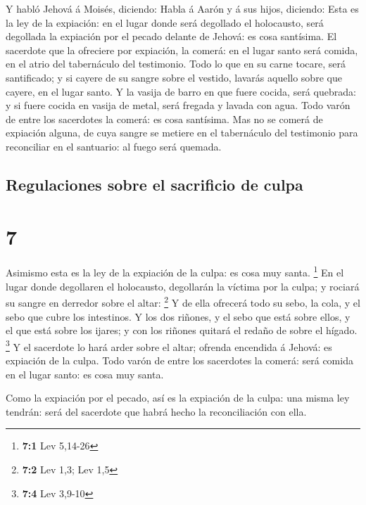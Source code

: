  Y habló Jehová á Moisés, diciendo:  Habla
á Aarón y á sus hijos, diciendo: Esta es la ley de la expiación: en el
lugar donde será degollado el holocausto, será degollada la expiación
por el pecado delante de Jehová: es cosa santísima.  El
sacerdote que la ofreciere por expiación, la comerá: en el lugar santo
será comida, en el atrio del tabernáculo del testimonio. 
Todo lo que en su carne tocare, será santificado; y si cayere de su
sangre sobre el vestido, lavarás aquello sobre que cayere, en el lugar
santo.  Y la vasija de barro en que fuere cocida, será
quebrada: y si fuere cocida en vasija de metal, será fregada y lavada
con agua.  Todo varón de entre los sacerdotes la comerá:
es cosa santísima.  Mas no se comerá de expiación alguna,
de cuya sangre se metiere en el tabernáculo del testimonio para
reconciliar en el santuario: al fuego será quemada.

\hypertarget{regulaciones-sobre-el-sacrificio-de-culpa}{%
\subsection{Regulaciones sobre el sacrificio de
culpa}\label{regulaciones-sobre-el-sacrificio-de-culpa}}

\hypertarget{section-6}{%
\section{7}\label{section-6}}

 Asimismo esta es la ley de la expiación de la culpa: es
cosa muy santa. \footnote{\textbf{7:1} Lev 5,14-26}  En el
lugar donde degollaren el holocausto, degollarán la víctima por la
culpa; y rociará su sangre en derredor sobre el altar: \footnote{\textbf{7:2}
  Lev 1,3; Lev 1,5}  Y de ella ofrecerá todo su sebo, la
cola, y el sebo que cubre los intestinos.  Y los dos
riñones, y el sebo que está sobre ellos, y el que está sobre los ijares;
y con los riñones quitará el redaño de sobre el hígado. \footnote{\textbf{7:4}
  Lev 3,9-10}  Y el sacerdote lo hará arder sobre el
altar; ofrenda encendida á Jehová: es expiación de la culpa.
 Todo varón de entre los sacerdotes la comerá: será comida
en el lugar santo: es cosa muy santa.

 Como la expiación por el pecado, así es la expiación de
la culpa: una misma ley tendrán: será del sacerdote que habrá hecho la
reconciliación con ella.

